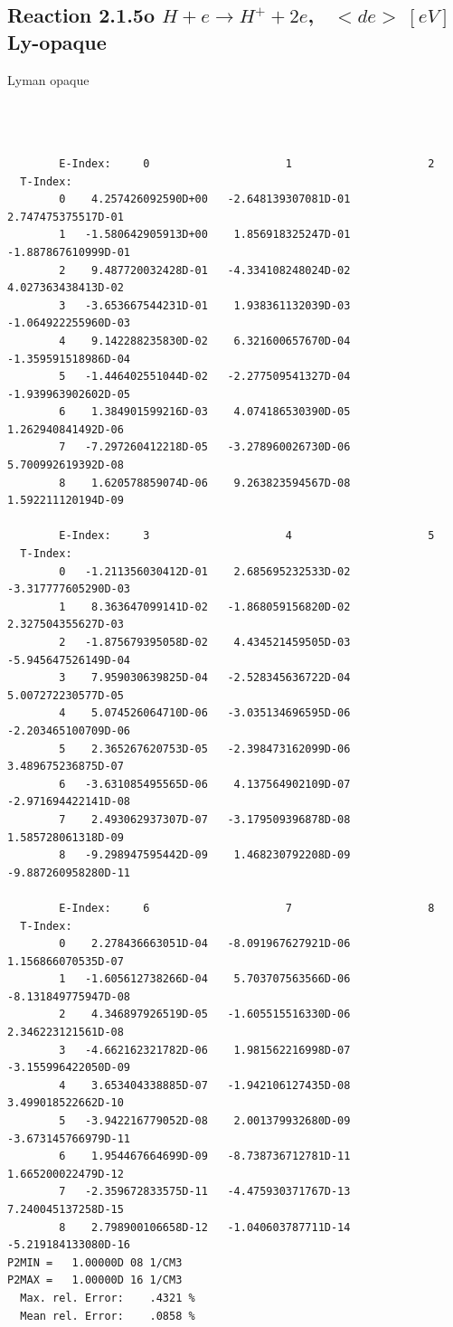 \documentclass[12pt,dvipdfmx]{article}
\begin{document}
\subsection{
Reaction 2.1.5o  $ H + e \rightarrow H^+ + 2e    $, \   $<de> \ [eV]$ Ly-opaque}

Lyman opaque

\begin{small}\begin{verbatim}



        E-Index:     0                     1                     2
  T-Index:
        0    4.257426092590D+00   -2.648139307081D-01    2.747475375517D-01
        1   -1.580642905913D+00    1.856918325247D-01   -1.887867610999D-01
        2    9.487720032428D-01   -4.334108248024D-02    4.027363438413D-02
        3   -3.653667544231D-01    1.938361132039D-03   -1.064922255960D-03
        4    9.142288235830D-02    6.321600657670D-04   -1.359591518986D-04
        5   -1.446402551044D-02   -2.277509541327D-04   -1.939963902602D-05
        6    1.384901599216D-03    4.074186530390D-05    1.262940841492D-06
        7   -7.297260412218D-05   -3.278960026730D-06    5.700992619392D-08
        8    1.620578859074D-06    9.263823594567D-08    1.592211120194D-09

        E-Index:     3                     4                     5
  T-Index:
        0   -1.211356030412D-01    2.685695232533D-02   -3.317777605290D-03
        1    8.363647099141D-02   -1.868059156820D-02    2.327504355627D-03
        2   -1.875679395058D-02    4.434521459505D-03   -5.945647526149D-04
        3    7.959030639825D-04   -2.528345636722D-04    5.007272230577D-05
        4    5.074526064710D-06   -3.035134696595D-06   -2.203465100709D-06
        5    2.365267620753D-05   -2.398473162099D-06    3.489675236875D-07
        6   -3.631085495565D-06    4.137564902109D-07   -2.971694422141D-08
        7    2.493062937307D-07   -3.179509396878D-08    1.585728061318D-09
        8   -9.298947595442D-09    1.468230792208D-09   -9.887260958280D-11

        E-Index:     6                     7                     8
  T-Index:
        0    2.278436663051D-04   -8.091967627921D-06    1.156866070535D-07
        1   -1.605612738266D-04    5.703707563566D-06   -8.131849775947D-08
        2    4.346897926519D-05   -1.605515516330D-06    2.346223121561D-08
        3   -4.662162321782D-06    1.981562216998D-07   -3.155996422050D-09
        4    3.653404338885D-07   -1.942106127435D-08    3.499018522662D-10
        5   -3.942216779052D-08    2.001379932680D-09   -3.673145766979D-11
        6    1.954467664699D-09   -8.738736712781D-11    1.665200022479D-12
        7   -2.359672833575D-11   -4.475930371767D-13    7.240045137258D-15
        8    2.798900106658D-12   -1.040603787711D-14   -5.219184133080D-16
P2MIN =   1.00000D 08 1/CM3
P2MAX =   1.00000D 16 1/CM3
  Max. rel. Error:    .4321 %
  Mean rel. Error:    .0858 %

\end{verbatim}\end{small}
\end{document}
